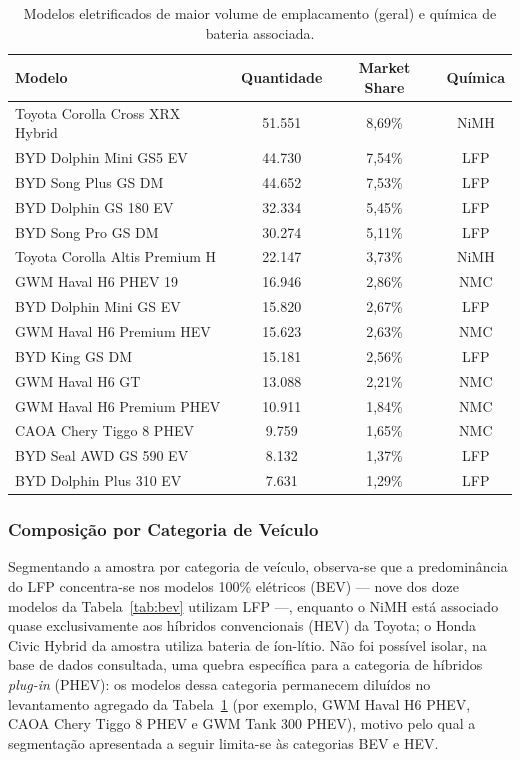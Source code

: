 \begin{table}[H]
\centering
\caption{Modelos eletrificados de maior volume de emplacamento (geral) e química
         de bateria associada.}
\label{tab:emplacamentos-geral}
\begin{tabular}{lccc}
\toprule
\textbf{Modelo} & \textbf{Quantidade} & \textbf{Market Share} & \textbf{Química} \\
\midrule
Toyota Corolla Cross XRX Hybrid & 51.551 & 8,69\% & NiMH \\
BYD Dolphin Mini GS5 EV         & 44.730 & 7,54\% & LFP \\
BYD Song Plus GS DM             & 44.652 & 7,53\% & LFP \\
BYD Dolphin GS 180 EV           & 32.334 & 5,45\% & LFP \\
BYD Song Pro GS DM              & 30.274 & 5,11\% & LFP \\
Toyota Corolla Altis Premium H  & 22.147 & 3,73\% & NiMH \\
GWM Haval H6 PHEV 19            & 16.946 & 2,86\% & NMC \\
BYD Dolphin Mini GS EV          & 15.820 & 2,67\% & LFP \\
GWM Haval H6 Premium HEV        & 15.623 & 2,63\% & NMC \\
BYD King GS DM                  & 15.181 & 2,56\% & LFP \\
GWM Haval H6 GT                 & 13.088 & 2,21\% & NMC \\
GWM Haval H6 Premium PHEV       & 10.911 & 1,84\% & NMC \\
CAOA Chery Tiggo 8 PHEV         &  9.759 & 1,65\% & NMC \\
BYD Seal AWD GS 590 EV          &  8.132 & 1,37\% & LFP \\
BYD Dolphin Plus 310 EV         &  7.631 & 1,29\% & LFP \\
\bottomrule
\end{tabular}
\end{table}

\subsubsection{Composição por Categoria de Veículo}
\label{subsec:composicao-categoria}

Segmentando a amostra por categoria de veículo, observa-se que a predominância do
LFP concentra-se nos modelos 100\% elétricos (BEV) — nove dos doze modelos da
Tabela~\ref{tab:bev} utilizam LFP —, enquanto o NiMH está associado quase
exclusivamente aos híbridos convencionais (HEV) da Toyota; o Honda Civic Hybrid
da amostra utiliza bateria de íon-lítio. Não foi possível isolar, na base de dados
consultada, uma quebra específica para a categoria de híbridos \textit{plug-in}
(PHEV): os modelos dessa categoria permanecem diluídos no levantamento agregado da
Tabela~\ref{tab:emplacamentos-geral} (por exemplo, GWM Haval H6 PHEV, CAOA Chery
Tiggo 8 PHEV e GWM Tank 300 PHEV), motivo pelo qual a segmentação apresentada a
seguir limita-se às categorias BEV e HEV.

